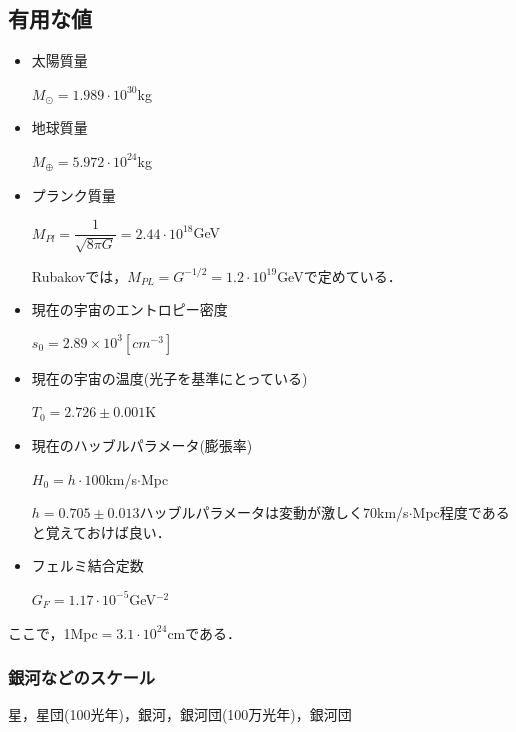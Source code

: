 \subsection*{有用な値}
\begin{itemize}
\item{太陽質量\begin{flushright}$M_{\odot}=1.989\cdot10^30$kg\end{flushright}}
\item{地球質量\begin{flushright}$M_{\oplus}=5.972\cdot10^24$kg\end{flushright}}
\item{プランク質量\begin{flushright}$M_{Pl}=\dfrac{1}{\sqrt{8\pi G}}=2.44\cdot10^{18}$GeV\end{flushright}}
Rubakovでは，$M_{PL}=G^{-1/2}=1.2\cdot 10^{19}$GeVで定めている．
\item{現在の宇宙のエントロピー密度\begin{flushright}$s_0=2.89\times 10^3 [cm^{-3}]$\end{flushright}}
\item{現在の宇宙の温度(光子を基準にとっている)\begin{flushright}$T_0=2.726\pm0.001$K\end{flushright}}
\item{現在のハッブルパラメータ(膨張率)\begin{flushright}$H_0=h\cdot100$km/s$\cdot$Mpc\end{flushright}

$h=0.705\pm0.013$ハッブルパラメータは変動が激しく$70$km/s$\cdot$Mpc程度であると覚えておけば良い．}
\item{フェルミ結合定数\begin{flushright}$G_{F}=1.17\cdot10^{-5}$GeV$^{-2}$\end{flushright}}

\end{itemize}
ここで，1Mpc$=3.1\cdot10^{24}$cmである．
\subsubsection*{銀河などのスケール}
\begin{center}
星，星団(100光年)，銀河，銀河団(100万光年)，銀河団
\end{center}
